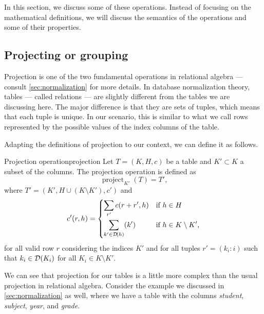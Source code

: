 In this section, we discuss some of these operations.  Instead of focusing on the
mathematical definitions, we will discuss the semantics of the operations and some
of their properties.

\subsection{Projecting or grouping}
\label{sub:projection}

Projection is one of the two fundamental operations in relational algebra --- consult
\cref{sec:normalization} for more details.  In database normalization theory, tables ---
called relations --- are slightly different from the tables we are discussing here. The
major difference is that they are sets of tuples, which means that each tuple is unique.
In our scenario, this is similar to what we call rows represented by the possible values
of the index columns of the table.

Adapting the definitions of projection to our context, we can define it as follows.

\begin{defbox}{Projection operation}{projection}
  Let $T = (K, H, c)$ be a table and $K' \subset K$ a subset of the columns.  The
  projection operation is defined as \[
    \operatorname{project}_{K'}(T) = T'\text{,}
  \] where $T' = (K', H \cup (K \setminus K'), c')$ and \[
    c'(r, h) = \begin{dcases}
      \sum_{r'} c(r + r', h) & \text{if } h \in H \\
      \sum_{k' \in \mathcal{D}\!\left(h\right)} (k') & \text{if } h \in K \setminus K'\text{,}
    \end{dcases}
  \] for all valid row $r$ considering the indices $K'$ and for all tuples $r' = (k_i :
  i)$ such that $k_i \in \mathcal{D}\!\left(K_i\right)$ for all $K_i \in K \setminus K'$.
\end{defbox}

We can see that projection for our tables is a little more complex than the usual
projection in relational algebra.  Consider the example we discussed in
\cref{sec:normalization} as well, where we have a table with the columns \emph{student},
\emph{subject}, \emph{year}, and \emph{grade}.

